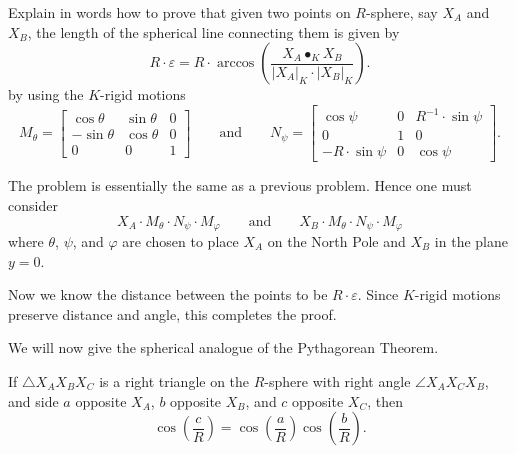 \documentclass{ximera}
\begin{document}
\begin{problem}
  Explain in words how to prove that given two points on $R$-sphere,
  say $X_A$ and $X_B$, the length of the spherical line connecting them
  is given by
  \[
  R\cdot \varepsilon = R\cdot\arccos\left(\frac{X_A\bullet_K X_B}{|X_A|_K\cdot |X_B|_K}\right).
  \]
  by using the $K$-rigid motions
  \[
   M_\theta=
  \begin{bmatrix}
    \cos\theta & \sin\theta & 0\\
    -\sin\theta & \cos\theta & 0\\
    0 & 0 & 1
  \end{bmatrix}
  \qquad\text{and}\qquad
  N_\psi=
  \begin{bmatrix}
    \cos\psi & 0 & R^{-1}\cdot\sin\psi\\
    0 & 1 & 0\\
    -R\cdot\sin\psi & 0 & \cos\psi
  \end{bmatrix}.
  \]
  \begin{freeResponse}
    The problem is essentially the same as a previous problem. Hence one must consider
    \[
    X_A\cdot M_\theta\cdot N_\psi\cdot M_\varphi \qquad\text{and}\qquad
    X_B\cdot M_\theta\cdot N_\psi\cdot M_\varphi
    \]
    where $\theta$, $\psi$, and $\varphi$ are chosen to place $X_A$ on
    the North Pole and $X_B$ in the plane $y=0$.

    Now we know the distance between the points to be $R\cdot
    \varepsilon$. Since $K$-rigid motions preserve distance and angle,
    this completes the proof.
  \end{freeResponse}
\end{problem}


We will now give the spherical analogue of the Pythagorean Theorem.

\begin{theorem}
  If $\triangle X_AX_BX_C$ is a right triangle on the $R$-sphere with right
  angle $\angle X_AX_CX_B$, and side $a$ opposite $X_A$, $b$ opposite $X_B$,
  and $c$ opposite $X_C$, then
  \[
  \cos\left(\frac{c}{R}\right)=\cos\left(\frac{a}{R}\right)\cos\left(\frac{b}{R}\right).
  \]
\end{theorem}
\end{document}
